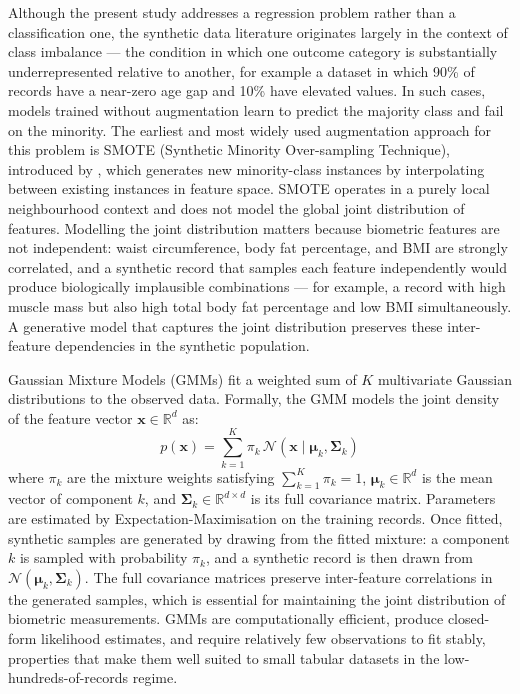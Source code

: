 \documentclass[11pt,a4paper]{report}
\begin{document}
Although the present study addresses a regression problem rather than a classification one, the
synthetic data literature originates largely in the context of class imbalance --- the condition in
which one outcome category is substantially underrepresented relative to another, for example a
dataset in which 90\% of records have a near-zero age gap and 10\% have elevated values. In such
cases, models trained without augmentation learn to predict the majority class and fail on the
minority. The earliest and most widely used augmentation approach for this problem is SMOTE
(Synthetic Minority Over-sampling Technique), introduced
by \citet{Chawla2002}, which generates new minority-class instances by interpolating between
existing instances in feature space. SMOTE operates in a purely local neighbourhood context and
does not model the global joint distribution of features. Modelling the joint distribution matters
because biometric features are not independent: waist circumference, body fat percentage, and BMI
are strongly correlated, and a synthetic record that samples each feature independently would
produce biologically implausible combinations --- for example, a record with high muscle mass but
also high total body fat percentage and low BMI simultaneously. A generative model that captures
the joint distribution preserves these inter-feature dependencies in the synthetic population.

Gaussian Mixture Models (GMMs) fit a weighted sum of $K$ multivariate Gaussian distributions to
the observed data. Formally, the GMM models the joint density of the feature vector
$\mathbf{x} \in \mathbb{R}^d$ as:
\begin{equation}
p(\mathbf{x}) = \sum_{k=1}^{K} \pi_k \, \mathcal{N}(\mathbf{x} \mid \boldsymbol{\mu}_k, \boldsymbol{\Sigma}_k)
\end{equation}
where $\pi_k$ are the mixture weights satisfying $\sum_{k=1}^{K} \pi_k = 1$,
$\boldsymbol{\mu}_k \in \mathbb{R}^d$ is the mean vector of component $k$, and
$\boldsymbol{\Sigma}_k \in \mathbb{R}^{d \times d}$ is its full covariance matrix. Parameters are
estimated by Expectation-Maximisation on the training records. Once fitted, synthetic samples are
generated by drawing from the fitted mixture: a component $k$ is sampled with probability $\pi_k$,
and a synthetic record is then drawn from $\mathcal{N}(\boldsymbol{\mu}_k, \boldsymbol{\Sigma}_k)$.
The full covariance matrices preserve inter-feature correlations in the generated samples, which is
essential for maintaining the joint distribution of biometric measurements. GMMs are computationally
efficient, produce closed-form likelihood estimates, and require relatively few observations to fit
stably, properties that make them well suited to small tabular datasets in the
low-hundreds-of-records regime.
\end{document}
